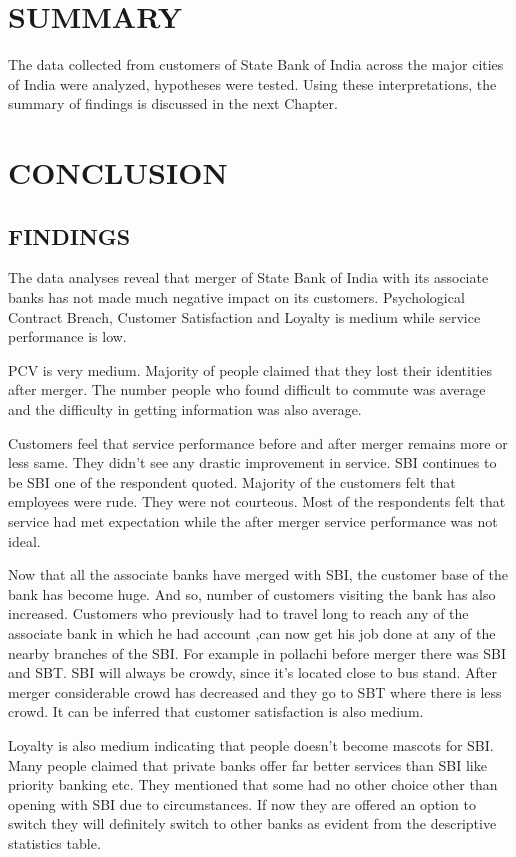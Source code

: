 \documentclass[a4paper, 14pt]{extarticle}
\begin{document}
{\section{SUMMARY}

The data collected from customers of State Bank of India across the major cities of India were analyzed, hypotheses were tested. Using these interpretations, the summary of findings is discussed in the next Chapter.

\newpage
\section{CONCLUSION}
\subsection{FINDINGS}
The data analyses reveal that merger of State Bank of India with its associate banks has not made much negative impact on its customers. Psychological Contract Breach, Customer Satisfaction and Loyalty is medium while service performance is low.

PCV is very medium. Majority of people claimed that they lost their identities after merger. The number people who found difficult to commute was average and the difficulty in getting information was also average.

Customers feel that service performance before and after merger remains more or less same. They didn't see any drastic improvement in service. SBI continues to be SBI one of the respondent quoted. Majority of the customers felt that employees were rude. They were not courteous. Most of the respondents felt that service had met expectation while the after merger service performance was not ideal.

Now that all the associate banks have merged with SBI, the customer base of the bank has become huge. And so, number of customers visiting the bank has also increased. Customers who previously had to travel long to reach any of the associate bank in which he had account ,can now get his job done at any of the nearby branches of the SBI. For example in pollachi before merger there was SBI and SBT. SBI will always be crowdy, since it's located close to bus stand. After merger considerable crowd has decreased and they go to SBT where there is less crowd. It can be inferred that customer satisfaction is also medium.

Loyalty is also medium indicating that people doesn't become mascots for SBI. Many people claimed that private banks offer far better services than SBI like priority banking etc. They mentioned that some had no other choice other than opening with SBI due to circumstances. If now they are offered an option to switch they will definitely switch to other banks as evident from the descriptive statistics table.

}
\end{document}

